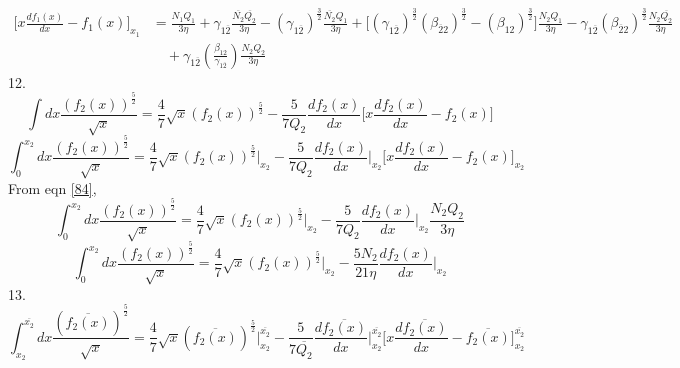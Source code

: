 \documentclass[fleqn, 10pt]{article}
\begin{document}
            \begin{equation}
            \begin{split}
                \biggl[x\frac{df_1(x)}{dx}-f_1(x)\biggr]_{x_1} & = \frac{N_1Q_1}{3\eta}+\gamma_{1\overline{2}}\frac{\overline{N_{2}}\overline{Q_{2}}}{3\eta}-(\gamma_{1\overline{2}})^\frac{3}{2}\frac{\overline{N_{2}}Q_1}{3\eta}+\biggl[(\gamma_{1\overline{2}})^\frac{3}{2}(\beta_{\overline{2}2})^\frac{3}{2}-(\beta_{12})^\frac{3}{2}\biggr]\frac{N_{2}Q_1}{3\eta}-\gamma_{1\overline{2}}(\beta_{\overline{2}2})^\frac{3}{2}\frac{N_{2}\overline{Q_{2}}}{3\eta} \\ & \quad +\gamma_{1\overline{2}}\left(\frac{\beta_{12}}{\gamma_{1\overline{2}}}\right)\frac{N_{2}Q_{2}}{3\eta}
                \label{36}
                \end{split}
            \end{equation}
 12.
                      \begin{equation*}
                         \int dx \frac{(f_{2}(x))^\frac{5}{2}}{\sqrt{x}} = \frac{4}{7} \sqrt{x} (f_{2}(x))^\frac{5}{2} - \frac{5}{7Q_{2}}\frac{df_{2}(x)}{dx}\biggl[x\frac{df_{2}(x)}{dx}-f_{2}(x)\biggr]
                      \end{equation*}
                      \begin{equation*}
                          \int^{x_{2}}_0 dx \frac{(f_{2}(x))^\frac{5}{2}}{\sqrt{x}} =  \frac{4}{7} \sqrt{x} (f_{2}(x))^\frac{5}{2}\Bigg|_{x_{2}} -  \frac{5}{7Q_{2}}\frac{df_{2}(x)}{dx} \Bigg|_{x_{2}} \biggl[x\frac{df_{2}(x)}{dx}-f_{2}(x)\biggr]_{x_{2}}
                      \end{equation*}
                      From eqn \ref{84},
                      \begin{equation*}
                            \int^{x_{2}}_0 dx \frac{(f_{2}(x))^\frac{5}{2}}{\sqrt{x}} =  \frac{4}{7} \sqrt{x} (f_{2}(x))^\frac{5}{2}\Bigg|_{x_{2}} -  \frac{5}{7Q_{2}}\frac{df_{2}(x)}{dx} \Bigg|_{x_{2}} \frac{N_{2}Q_{2}}{3\eta}
                      \end{equation*}
                      \begin{equation}
                          \int^{x_{2}}_0 dx \frac{(f_{2}(x))^\frac{5}{2}}{\sqrt{x}} =   \frac{4}{7} \sqrt{x} (f_{2}(x))^\frac{5}{2} \Bigg|_{x_{2}} -   \frac{5N_{2}}{21\eta}\frac{df_{2}(x)}{dx}\Bigg|_{x_{2}}
                          \label{38}
                      \end{equation}
13.
                      \begin{equation*}
                          \int^{\overline{x_{2}}}_{x_{2}}dx \frac{(\overline{f_{2}(x)})^\frac{5}{2}}{\sqrt{x}}=  \frac{4}{7}\sqrt{x}(\overline{f_{2}(x)})^\frac{5}{2}\Bigg|^{\overline{x_{2}}}_{x_{2}} -  \frac{5}{7\overline{Q_{2}}}\frac{d\overline{f_{2}(x)}}{dx}\Bigg|^{\overline{x_{2}}}_{x_{2}}\biggl[x\frac{d\overline{f_{2}(x)}}{dx}-\overline{f_{2}(x)}\biggr]^{\overline{x_{2}}}_{x_{2}}
                      \end{equation*}
\end{document}
